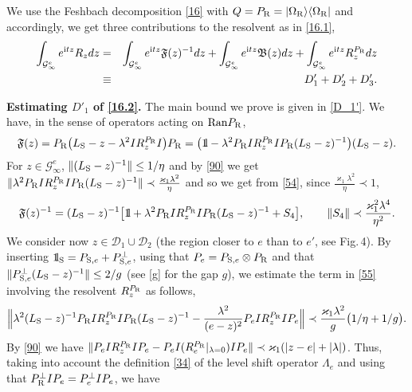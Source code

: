 \documentclass[letterpaper,onecolumn,11pt,accepted=2021-12-09]{quantumarticle}
\numberwithin{equation}{section}
\renewcommand{\r}{{\rm R}}
\newcommand{\s}{{\rm S}}
\renewcommand{\i}{{\rm i}}
\newcommand{\bbbone}{\mathchoice {\rm 1\mskip-4mu l} {\rm 1\mskip-4mu l}
	{\rm 1\mskip-4.5mu l} {\rm 1\mskip-5mu l}}
\begin{document}
We use the Feshbach decomposition \eqref{16} with $Q=P_\r = |\Omega_\r\rangle\langle \Omega_\r|$ and accordingly, we get three contributions to the resolvent as in \eqref{16.1},
\begin{eqnarray}
	\label{16.2}
	\int_{{\mathcal G}_\infty^e} e^{\i t z} R_z dz &=& \int_{{\mathcal G}_\infty^e} e^{\i t z}{\mathfrak F}(z)^{-1} dz +\int_{{\mathcal G}_\infty^e} e^{\i t z}{\mathfrak B}(z) dz + \int_{{\mathcal G}_\infty^e} e^{\i t z}R^{P_\r}_z dz\nonumber\\
& \equiv& D'_1+D'_2+D'_3. 
\end{eqnarray}
\bigskip

\noindent
{\bf Estimating $D'_1$ of \eqref{16.2}. } The main bound we prove is given in \eqref{D_1'}. We have, in the sense of operators acting on ${\rm Ran}P_\r$,
\begin{equation} 
{\mathfrak F}(z) = P_\r\big( L_\s -z-\lambda^2 I R_z^{P_\r}I \big) P_\r =\big(\bbbone-\lambda^2 P_\r I R_z^{P_\r}I P_\r(L_\s-z)^{-1} \big) (L_\s-z).
\label{54}
\end{equation}
For $z\in{\mathcal G}_\infty^e$, $\|(L_\s-z)^{-1}\|\le 1/\eta$ and by \eqref{90} we get $\|\lambda^2  P_\r IR_z^{P_\r} IP_\r(L_\s-z)^{-1}\|\prec  \frac{\varkappa_1\lambda^2}{\eta}$ 
and so we get from \eqref{54}, since  $\frac{\varkappa_1\lambda^2}{\eta}\prec 1$, 
\begin{equation} 
	\label{55}
	{\mathfrak F}(z)^{-1} = (L_\s-z)^{-1} \big[ \bbbone +\lambda^2 P_\r I R_z^{P_\r}I P_\r(L_\s-z)^{-1} + S_4\big],\qquad 
\|S_4\| \prec \frac{\varkappa^2_1\lambda^4}{\eta^2}.  
\end{equation}
We consider now $z\in{\mathcal D}_1\cup{\mathcal D}_2$  (the region  closer to $e$ than to $e'$, see Fig.\,4). By inserting $\bbbone_\s = P_{\s,e} +P_{\s,e}^\perp$, using that $P_e=P_{\s,e}\otimes P_\r$ and that  $\|P_{\s,e}^\perp (L_\s-z)^{-1}\|\le 2/g$ (see \eqref{g} for the gap $g$), we estimate the term in \eqref{55} involving the resolvent $R_z^{P_\r}$ as follows,
\begin{equation}
	\label{57}
\Big\| \lambda^2 (L_\s-z)^{-1}  P_\r I R_z^{P_\r}I P_\r(L_\s-z)^{-1}- \frac{\lambda^2}{(e-z)^2} P_e I R_z^{P_\r}I P_e\Big\|\prec  \frac{\varkappa_1\lambda^2}{g}\big( 1/\eta +1/g\big).
\end{equation}
By \eqref{90}  we have $\| P_eI R_z^{P_\r}IP_e - P_eI (R_e^{P_\r}|_{\lambda=0} )IP_e \|\prec \varkappa_1(|z-e|+|\lambda|)$. Thus, taking into account the definition \eqref{34} of the level shift operator $\Lambda_e$ and using that $P^\perp_\r IP_e = P^\perp_e IP_e$,  we have
\end{document}
